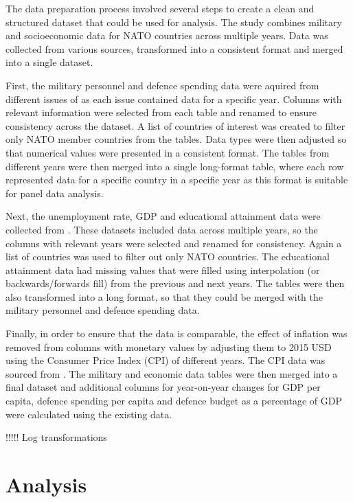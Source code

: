 The data preparation process involved several steps to create a clean and structured 
dataset that could be used for analysis. The study combines military and socioeconomic 
data for NATO countries across multiple years. Data was collected from various sources,
transformed into a consistent format and merged into a single dataset.

First, the military personnel and defence 
spending data were aquired from different issues of \textcite{noauthor_military_balance_nodate} 
as each issue contained data for a specific year. Columns with relevant information were 
selected from each table and renamed to ensure consistency across the dataset. A list of 
countries of interest was created to filter only NATO member countries from the tables.
Data types were then adjusted so that numerical values were presented in a consistent format.
The tables from different years were then merged into a single long-format table, where
each row represented data for a specific country in a specific year as this format is 
suitable for panel data analysis.

Next, the unemployment rate, GDP and educational attainment data were collected from 
\textcite{noauthor_world_bank_nodate}. These datasets included data across multiple years, 
so the columns with relevant years were selected and renamed for consistency. Again a 
list of countries was used to filter out only NATO countries. The educational attainment 
data had missing values that were filled using interpolation (or backwards/forwards fill) from the previous and next 
years. The tables were then also transformed into a long format, so that they could be 
merged with the military personnel and defence spending data.

Finally, in order to ensure that the data is comparable, the effect of inflation was removed 
from columns with monetary values by adjusting them to 2015 USD using the Consumer Price 
Index (CPI) of different years. The CPI data was sourced from \textcite{federal_reserve_bank_of_minneapolis_consumer_nodate}. 
The military and economic data tables were then merged into a final dataset and additional 
columns for year-on-year changes for GDP per capita, defence spending per capita  
and defence budget as a percentage of GDP were calculated using the existing data.

!!!!! Log transformations

\section{Analysis}

